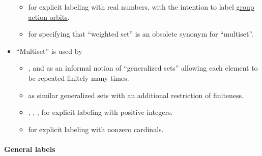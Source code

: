 \begin{remark}
\begin{itemize}
\begin{itemize}
      \item {} for explicit labeling with real numbers, with the intention to label \hyperref[def:group_action_orbit]{group action orbits}.

      \item {} for specifying that \enquote{weighted set} is an obsolete synonym for \enquote{multiset}.
    \end{itemize}

    \item \enquote{Multiset} is used by
    \begin{itemize}
      \item {},  and  as an informal notion of \enquote{generalized sets} allowing each element to be repeated finitely many times.

      \item {} as similar generalized sets with an additional restriction of finiteness.

      \item {}, , ,   for explicit labeling with positive integers.

      \item {} for explicit labeling with nonzero cardinals.
    \end{itemize}
  \end{itemize}
\end{remark}

\paragraph{General labels}

